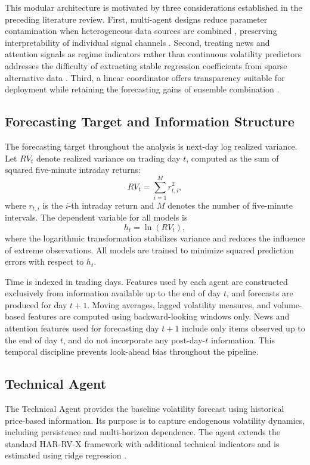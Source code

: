 \documentclass[review]{elsarticle}
\begin{document}
This modular architecture is motivated by three considerations established in the preceding literature review. First, multi-agent designs reduce parameter contamination when heterogeneous data sources are combined \cite{zhang2025}, preserving interpretability of individual signal channels \cite{celik2022}. Second, treating news and attention signals as regime indicators rather than continuous volatility predictors addresses the difficulty of extracting stable regression coefficients from sparse alternative data \cite{tetlock2007,da2011}. Third, a linear coordinator offers transparency suitable for deployment while retaining the forecasting gains of ensemble combination \cite{ramos2019}.

\subsection{Forecasting Target and Information Structure}\label{forecasting-target}

The forecasting target throughout the analysis is next-day log realized variance. Let $RV_t$ denote realized variance on trading day $t$, computed as the sum of squared five-minute intraday returns:
\[
RV_t = \sum_{i=1}^{M} r_{t,i}^{2},
\]
where $r_{t,i}$ is the $i$-th intraday return and $M$ denotes the number of five-minute intervals. The dependent variable for all models is
\[
h_t = \ln(RV_t),
\]
where the logarithmic transformation stabilizes variance and reduces the influence of extreme observations. All models are trained to minimize squared prediction errors with respect to $h_t$.

Time is indexed in trading days. Features used by each agent are constructed exclusively from information available up to the end of day $t$, and forecasts are produced for day $t{+}1$. Moving averages, lagged volatility measures, and volume-based features are computed using backward-looking windows only. News and attention features used for forecasting day $t{+}1$ include only items observed up to the end of day $t$, and do not incorporate any post-day-$t$ information. This temporal discipline prevents look-ahead bias throughout the pipeline.

\subsection{Technical Agent}\label{technical-agent}

The Technical Agent provides the baseline volatility forecast using historical price-based information. Its purpose is to capture endogenous volatility dynamics, including persistence and multi-horizon dependence. The agent extends the standard HAR-RV-X framework \cite{corsi2009} with additional technical indicators and is estimated using ridge regression \cite{hoerl1970}.
\end{document}

